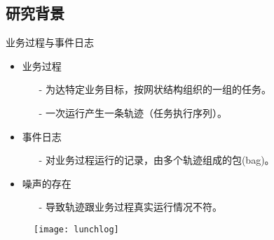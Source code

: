 \subsection{研究背景}
\begin{frame}{业务过程与事件日志}
	\begin{itemize}
	\item 业务过程
		\begin{itemize}
			\item [-]为达特定业务目标，按网状结构组织的一组的任务。
			\item [-]一次运行产生一条轨迹（任务执行序列）。
		\end{itemize}
	\item 事件日志
		\begin{itemize}
			\item [-]对业务过程运行的记录，由多个轨迹组成的包(bag)。
		\end{itemize}
	\item 噪声的存在
		\begin{itemize}
			\item [-]导致轨迹跟业务过程真实运行情况不符。
		\end{itemize}
	\end{itemize}
\begin{figure}
 \begin{center}
 \texttt{[image: lunchlog]}
 \end{center}
\end{figure}
\end{frame}
